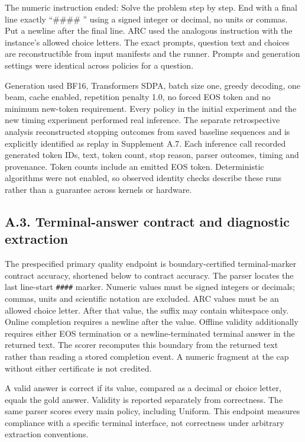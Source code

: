 \documentclass[
  12pt,
  a4paper,
]{article}
\begin{document}
The numeric instruction ended: Solve the problem step by step. End with
a final line exactly ``\#\#\#\# '' using a signed integer or decimal, no
units or commas. Put a newline after the final line. ARC used the
analogous instruction with the instance's allowed choice letters. The
exact prompts, question text and choices are reconstructible from input
manifests and the runner. Prompts and generation settings were identical
across policies for a question.

Generation used BF16, Transformers SDPA, batch size one, greedy
decoding, one beam, cache enabled, repetition penalty 1.0, no forced EOS
token and no minimum new-token requirement. Every policy in the initial
experiment and the new timing experiment performed real inference. The
separate retrospective analysis reconstructed stopping outcomes from
saved baseline sequences and is explicitly identified as replay in
Supplement A.7. Each inference call recorded generated token IDs, text,
token count, stop reason, parser outcomes, timing and provenance. Token
counts include an emitted EOS token. Deterministic algorithms were not
enabled, so observed identity checks describe these runs rather than a
guarantee across kernels or hardware.

\subsection{A.3. Terminal-answer contract and diagnostic
extraction}\label{a.3.-terminal-answer-contract-and-diagnostic-extraction}

The prespecified primary quality endpoint is boundary-certified
terminal-marker contract accuracy, shortened below to contract accuracy.
The parser locates the last line-start \texttt{\#\#\#\#} marker. Numeric
values must be signed integers or decimals; commas, units and scientific
notation are excluded. ARC values must be an allowed choice letter.
After that value, the suffix may contain whitespace only. Online
completion requires a newline after the value. Offline validity
additionally requires either EOS termination or a newline-terminated
terminal answer in the returned text. The scorer recomputes this
boundary from the returned text rather than reading a stored completion
event. A numeric fragment at the cap without either certificate is not
credited.

A valid answer is correct if its value, compared as a decimal or choice
letter, equals the gold answer. Validity is reported separately from
correctness. The same parser scores every main policy, including
Uniform. This endpoint measures compliance with a specific terminal
interface, not correctness under arbitrary extraction conventions.
\end{document}
